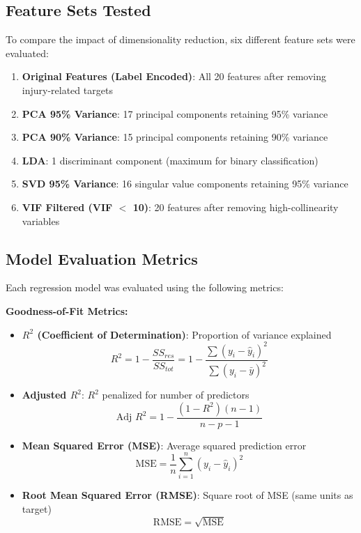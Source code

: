 \documentclass[12pt,man]{apa7}
\begin{document}
\subsection{Feature Sets Tested}

To compare the impact of dimensionality reduction, six different feature sets were evaluated:

\begin{enumerate}
    \item \textbf{Original Features (Label Encoded)}: All 20 features after removing injury-related targets
    \item \textbf{PCA 95\% Variance}: 17 principal components retaining 95\% variance
    \item \textbf{PCA 90\% Variance}: 15 principal components retaining 90\% variance
    \item \textbf{LDA}: 1 discriminant component (maximum for binary classification)
    \item \textbf{SVD 95\% Variance}: 16 singular value components retaining 95\% variance
    \item \textbf{VIF Filtered (VIF $<$ 10)}: 20 features after removing high-collinearity variables
\end{enumerate}

\subsection{Model Evaluation Metrics}

Each regression model was evaluated using the following metrics:

\textbf{Goodness-of-Fit Metrics:}
\begin{itemize}
    \item \textbf{$R^2$ (Coefficient of Determination)}: Proportion of variance explained
    \begin{equation}
    R^2 = 1 - \frac{SS_{res}}{SS_{tot}} = 1 - \frac{\sum (y_i - \hat{y}_i)^2}{\sum (y_i - \bar{y})^2}
    \end{equation}

    \item \textbf{Adjusted $R^2$}: $R^2$ penalized for number of predictors
    \begin{equation}
    \text{Adj } R^2 = 1 - \frac{(1 - R^2)(n - 1)}{n - p - 1}
    \end{equation}

    \item \textbf{Mean Squared Error (MSE)}: Average squared prediction error
    \begin{equation}
    \text{MSE} = \frac{1}{n} \sum_{i=1}^{n} (y_i - \hat{y}_i)^2
    \end{equation}

    \item \textbf{Root Mean Squared Error (RMSE)}: Square root of MSE (same units as target)
    \begin{equation}
    \text{RMSE} = \sqrt{\text{MSE}}
    \end{equation}
\end{itemize}
\end{document}
